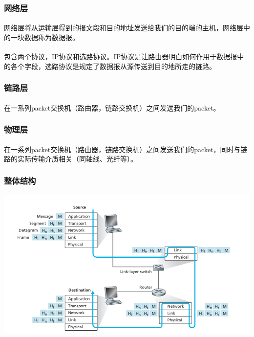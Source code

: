 \documentclass[12pt]{article}
\begin{document}
\begin{CJK}{UTF8}{gbsn}
\subsubsection{网络层}
\paragraph{}网络层将从运输层得到的报文段和目的地址发送给我们的目的端的主机，网络层中的一块数据称为数据报。
\paragraph{}包含两个协议，IP协议和选路协议。IP协议是让路由器明白如何作用于数据报中的各个字段，选路协议是规定了数据报从源传送到目的地所走的链路。

\subsubsection{链路层}
\paragraph{}在一系列packet交换机（路由器，链路交换机）之间发送我们的packet。

\subsubsection{物理层}
\paragraph{}在一系列packet交换机（路由器，链路交换机）之间发送我们的packet，同时与链路的实际传输介质相关（同轴线、光纤等）。

\subsubsection{整体结构}
\includegraphics[width=7in]{arch.png}


\end{CJK}
\end{document}
